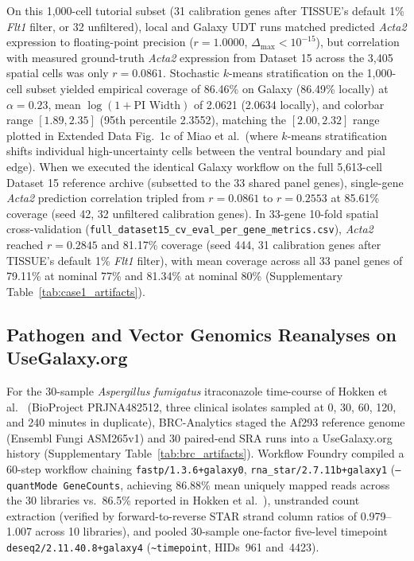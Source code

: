 \documentclass[11pt,letterpaper]{article}
\newcommand{\tool}[1]{\textsf{#1}}
\begin{document}
On this 1,000-cell tutorial subset (31 calibration genes after \tool{TISSUE}'s default 1\% \textit{Flt1} filter, or 32 unfiltered), local and Galaxy UDT runs matched predicted \textit{Acta2} expression to floating-point precision ($r = 1.0000$, $\Delta_{\max} < 10^{-15}$), but correlation with measured ground-truth \textit{Acta2} expression from Dataset 15 across the 3,405 spatial cells was only $r = 0.0861$. Stochastic $k$-means stratification on the 1,000-cell subset yielded empirical coverage of 86.46\% on Galaxy (86.49\% locally) at $\alpha = 0.23$, mean $\log(1 + \text{PI Width})$ of 2.0621 (2.0634 locally), and colorbar range $[1.89, 2.35]$ (95th percentile 2.3552), matching the $[2.00, 2.32]$ range plotted in Extended Data Fig.~1c of Miao et al.\ (where $k$-means stratification shifts individual high-uncertainty cells between the ventral boundary and pial edge). When we executed the identical Galaxy workflow on the full 5,613-cell Dataset 15 reference archive (subsetted to the 33 shared panel genes), single-gene \textit{Acta2} prediction correlation tripled from $r = 0.0861$ to $r = 0.2553$ at 85.61\% coverage (seed 42, 32 unfiltered calibration genes). In 33-gene 10-fold spatial cross-validation (\nolinkurl{full_dataset15_cv_eval_per_gene_metrics.csv}), \textit{Acta2} reached $r = 0.2845$ and 81.17\% coverage (seed 444, 31 calibration genes after \tool{TISSUE}'s default 1\% \textit{Flt1} filter), with mean coverage across all 33 panel genes of 79.11\% at nominal 77\% and 81.34\% at nominal 80\% (Supplementary Table~\ref{tab:case1_artifacts}).

\subsection*{Pathogen and Vector Genomics Reanalyses on UseGalaxy.org}
For the 30-sample \textit{Aspergillus fumigatus} itraconazole time-course of Hokken et al.\ \cite{hokken2018} (BioProject PRJNA482512, three clinical isolates sampled at 0, 30, 60, 120, and 240 minutes in duplicate), \tool{BRC-Analytics} staged the Af293 reference genome (Ensembl Fungi ASM265v1) and 30 paired-end SRA runs into a UseGalaxy.org history (Supplementary Table~\ref{tab:brc_artifacts}). \tool{Workflow Foundry} compiled a 60-step workflow chaining \nolinkurl{fastp/1.3.6+galaxy0}, \nolinkurl{rna_star/2.7.11b+galaxy1} (\texttt{--quantMode GeneCounts}, achieving 86.88\% mean uniquely mapped reads across the 30 libraries vs.\ 86.5\% reported in Hokken et al.\ \cite{hokken2018}), unstranded count extraction (verified by forward-to-reverse \tool{STAR} strand column ratios of 0.979--1.007 across 10 libraries), and pooled 30-sample one-factor five-level timepoint \nolinkurl{deseq2/2.11.40.8+galaxy4} (\texttt{\textasciitilde timepoint}, HIDs~961 and~4423).
\end{document}
